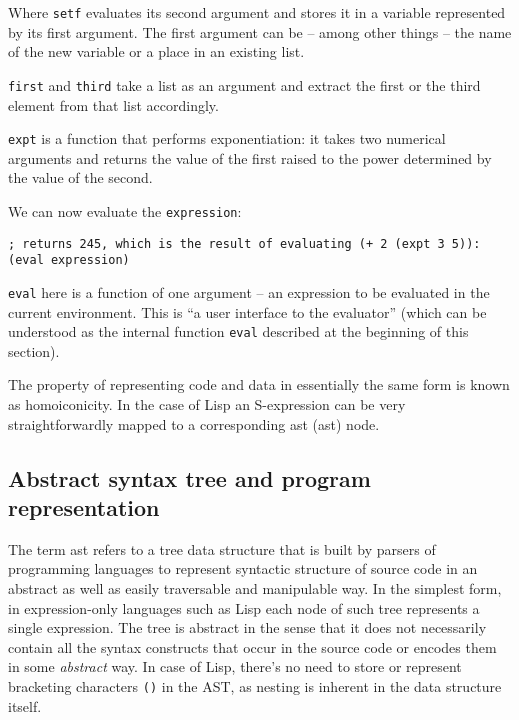Where \texttt{setf} evaluates its second argument and stores it in a variable represented by its first argument. The first argument can be -- among other things\cite[Section~11.15.1]{emacs_lisp_reference} -- the name of the new variable or a place in an existing list. 

\texttt{first} and \texttt{third} take a list as an argument and extract the first or the third element from that list accordingly.

\texttt{expt} is a function that performs exponentiation: it takes two numerical arguments and returns the value of the first raised to the power determined by the value of the second.

We can now evaluate the \texttt{expression}:
\begin{lstlisting}
; returns 245, which is the result of evaluating (+ 2 (expt 3 5)):
(eval expression)
\end{lstlisting}

\texttt{eval} here is a function of one argument -- an expression to be evaluated in the current environment. This is ``a user interface to the evaluator''\cite[Section~3.8, Function~EVAL]{common_lisp_hyperspec} (which can be understood as the internal function \texttt{eval} described at the beginning of this section).

The property of representing code and data in essentially the same form is known as homoiconicity\cite{homoiconicity_wikipedia, c2_homoiconicity, homoiconicity}. In the case of Lisp an S-expression can be very straightforwardly mapped to a corresponding \acrlong{ast} (\acrshort{ast}) node.


\subsection{Abstract syntax tree and program representation}
The term \acrshort{ast} refers to a tree data structure that is built
by parsers of programming languages to represent syntactic structure of source
code in an abstract as well as easily traversable and manipulable way. In the simplest form, in expression-only languages such as Lisp each node of such tree
represents a single expression. The tree is abstract in the sense that it does
not necessarily contain all the syntax constructs that occur in the source code
or encodes them in some \textit{abstract} way. In case of Lisp, there's no need to store or represent bracketing characters \texttt{()} in the AST, as nesting is inherent in the data structure itself.

